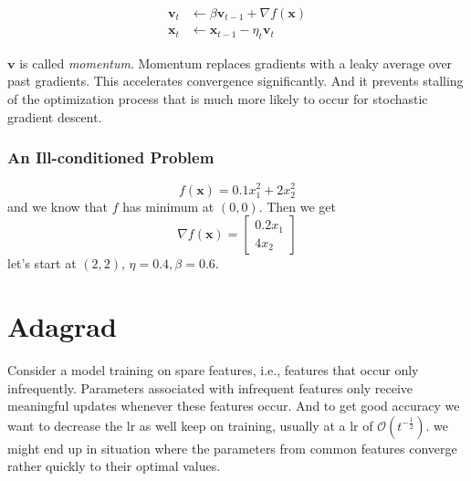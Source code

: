 \begin{equation}
    \begin{split}
        \mathbf{v}_t &\leftarrow \beta \mathbf{v}_{t-1} + \nabla f(\mathbf{x}) \\
        \mathbf{x}_t &\leftarrow \mathbf{x}_{t-1} - \eta_t \mathbf{v}_{t}
    \end{split}
\end{equation}

$\mathbf{v}$ is called \textit{momentum}. Momentum replaces gradients with a leaky average over past gradients. This 
accelerates convergence significantly. And it prevents stalling of the optimization process that is much more
likely to occur for stochastic gradient descent.

\subsubsection{An Ill-conditioned Problem}
\begin{equation}
    f(\mathbf{x}) = 0.1 x_1^2 + 2 x_2^2
\end{equation}
and we know that $f$ has minimum at $(0, 0)$. Then we get
\begin{equation}
    \nabla f(\mathbf{x}) = 
    \begin{bmatrix}
        0.2x_1 \\
        4x_2
    \end{bmatrix}
\end{equation}
let's start at $(2, 2)$, $\eta = 0.4, \beta = 0.6$.

\section{Adagrad}
Consider a model training on spare features, i.e., features that occur only infrequently. Parameters associated with infrequent
features only receive meaningful updates whenever these features occur. And to get good accuracy we want to decrease the lr as well
keep on training, usually at a lr of $\mathcal{O}(t^{-\frac{1}{2}})$. we might end up in situation where the parameters from common 
features converge rather quickly to their optimal values.

